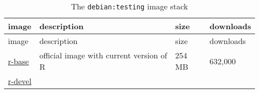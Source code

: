 \begin{longtable}[]{@{}llll@{}}
\caption{The \texttt{debian:testing} image stack}\tabularnewline
\toprule
\begin{minipage}[b]{0.20\columnwidth}\raggedright\strut
image\strut
\end{minipage} & \begin{minipage}[b]{0.50\columnwidth}\raggedright\strut
description\strut
\end{minipage} & \begin{minipage}[b]{0.08\columnwidth}\raggedright\strut
size\strut
\end{minipage} & \begin{minipage}[b]{0.10\columnwidth}\raggedright\strut
downloads\strut
\end{minipage}\tabularnewline
\midrule
\endfirsthead
\toprule
\begin{minipage}[b]{0.20\columnwidth}\raggedright\strut
image\strut
\end{minipage} & \begin{minipage}[b]{0.50\columnwidth}\raggedright\strut
description\strut
\end{minipage} & \begin{minipage}[b]{0.08\columnwidth}\raggedright\strut
size\strut
\end{minipage} & \begin{minipage}[b]{0.10\columnwidth}\raggedright\strut
downloads\strut
\end{minipage}\tabularnewline
\midrule
\endhead
\begin{minipage}[t]{0.20\columnwidth}\raggedright\strut
\href{https://hub.docker.com/r/_/r-base}{r-base}\strut
\end{minipage} & \begin{minipage}[t]{0.50\columnwidth}\raggedright\strut
official image with current version of R\strut
\end{minipage} & \begin{minipage}[t]{0.08\columnwidth}\raggedright\strut
254 MB\strut
\end{minipage} & \begin{minipage}[t]{0.10\columnwidth}\raggedright\strut
632,000\strut
\end{minipage}\tabularnewline
\begin{minipage}[t]{0.20\columnwidth}\raggedright\strut
\href{https://hub.docker.com/r/rocker/r-devel}{r-devel}\strut
\end{minipage} & \begin{minipage}[t]{0.50\columnwidth}\raggedright\strut

\end{minipage}
\end{longtable}
